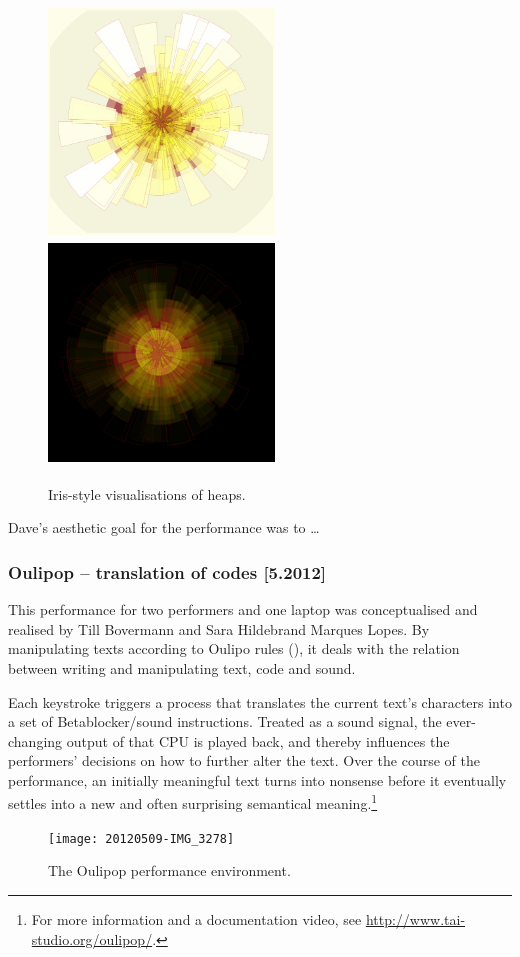 \documentclass[letterpaper, 12pt]{article}
\begin{document}
\begin{figure}
	\centering
		\includegraphics[width=6cm, height=6cm]{2013-heapIris-white}
		\includegraphics[width=6cm, height=6cm]{2013-heapIris-black}
	\caption{Iris-style visualisations of heaps.}
	\label{fig:fig_2013-heapIris-white}
\end{figure}

Dave's aesthetic goal for the performance was to \dots


\subsubsection{Oulipop -- translation of codes [5.2012]}
\label{sub:oulipop}

This performance for two performers and one laptop was conceptualised and realised by Till Bovermann and Sara Hildebrand Marques Lopes.
By manipulating texts according to Oulipo rules (\cite{mathews2005-oul}), it deals with the relation between writing and manipulating text, code and sound.

Each keystroke triggers a process that translates the current text's characters into a set of Betablocker/sound instructions. 
Treated as a sound signal, the ever-changing output of that CPU is played back, and thereby influences the performers' decisions on how to further alter the text. 
Over the course of the performance, an initially meaningful text turns into nonsense before it eventually settles into a new and often surprising semantical meaning.\footnote{For more information and a documentation video, see \url{http://www.tai-studio.org/oulipop/}.}
\begin{figure}
	\centering
		\texttt{[image: 20120509-IMG\_3278]}
	\caption{The Oulipop performance environment.}
	\label{fig:fig_20120509-IMG_3278}
\end{figure}
\end{document}
